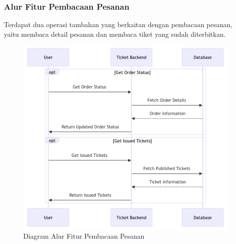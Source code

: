 \pagebreak

\subsubsection{Alur Fitur Pembacaan Pesanan}

Terdapat dua operasi tambahan yang berkaitan dengan pembacaan pesanan, yaitu membaca detail pesanan dan membaca tiket yang sudah diterbitkan.

\begin{figure}[h]
    \centering
    \includegraphics[width=1\textwidth]{resources/chapter-3/order-flow.png}
    \caption{Diagram Alur Fitur Pembacaan Pesanan}
    \label{fig:flow-order-flow}
\end{figure}